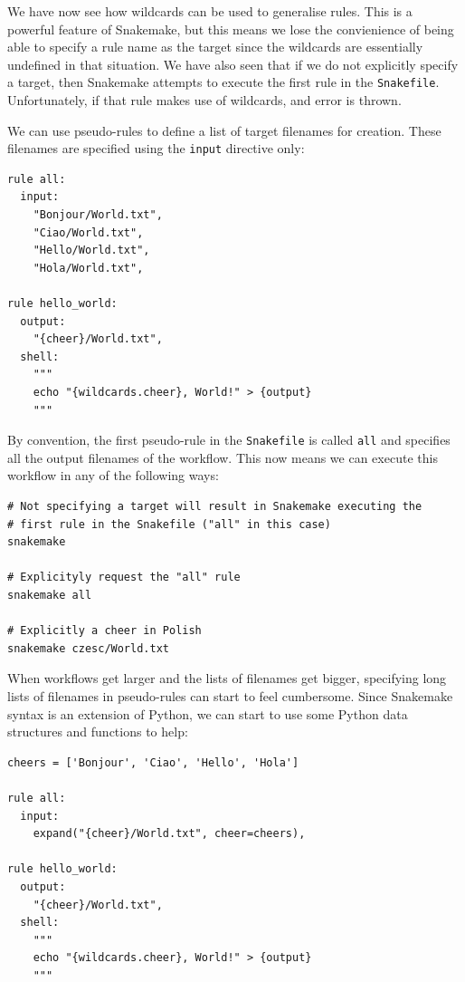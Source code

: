 We have now see how wildcards can be used to generalise rules. This is a powerful feature of Snakemake, but this means we lose the convienience of
being able to specify a rule name as the target since the wildcards are essentially undefined in that situation. We have also seen that if we do not
explicitly specify a target, then Snakemake attempts to execute the first rule in the \texttt{Snakefile}. Unfortunately, if that rule makes use of
wildcards, and error is thrown.

We can use pseudo-rules to define a list of target filenames for creation. These filenames are specified using the \texttt{input} directive only:

\begin{lstlisting}
rule all:
  input:
    "Bonjour/World.txt",
    "Ciao/World.txt",
    "Hello/World.txt",
    "Hola/World.txt",

rule hello_world:
  output:
    "{cheer}/World.txt",
  shell:
    """
    echo "{wildcards.cheer}, World!" > {output}
    """
\end{lstlisting}

By convention, the first pseudo-rule in the \texttt{Snakefile} is called \texttt{all} and specifies all the output filenames of the workflow. This now
means we can execute this workflow in any of the following ways:

\begin{lstlisting}
# Not specifying a target will result in Snakemake executing the
# first rule in the Snakefile ("all" in this case)
snakemake

# Explicityly request the "all" rule
snakemake all

# Explicitly a cheer in Polish
snakemake czesc/World.txt
\end{lstlisting}

When workflows get larger and the lists of filenames get bigger, specifying long lists of filenames in pseudo-rules can start to feel cumbersome.
Since Snakemake syntax is an extension of Python, we can start to use some Python data structures and functions to help:

\begin{lstlisting}
cheers = ['Bonjour', 'Ciao', 'Hello', 'Hola']

rule all:
  input:
    expand("{cheer}/World.txt", cheer=cheers),

rule hello_world:
  output:
    "{cheer}/World.txt",
  shell:
    """
    echo "{wildcards.cheer}, World!" > {output}
    """
\end{lstlisting}

